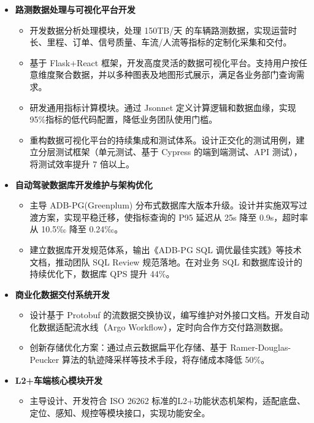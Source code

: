 \documentclass{resume}
\begin{document}
\begin{itemize}
  \item \textbf{路测数据处理与可视化平台开发}
    \begin{itemize}
        \item 开发数据分析处理模块，处理 150TB/天 的车辆路测数据，实现运营时长、里程、订单、信号质量、车流/人流等指标的定制化采集和交付。
        \item 基于 Flask+React 框架，开发高度灵活的数据可视化平台。支持用户按任意维度聚合数据，并以多种图表及地图形式展示，满足各业务部门查询需求。
        \item 研发通用指标计算模块。通过 Jsonnet 定义计算逻辑和数据血缘，实现 95\%指标的低代码配置，降低业务团队使用门槛。
        \item 重构数据可视化平台的持续集成和测试体系。设计正交化的测试用例，建立分层测试框架（单元测试、基于 Cypress 的端到端测试、API 测试），将测试效率提升 7 倍以上。
    \end{itemize}
  \item \textbf{自动驾驶数据库开发维护与架构优化}
    \begin{itemize}
        \item 主导 ADB-PG(Greenplum) 分布式数据库大版本升级。设计并实施双写过渡方案，实现平稳迁移，使指标查询的 P95 延迟从 25s 降至 0.9s，超时率从 10.5‰ 降至 0.24‰。
        \item 建立数据库开发规范体系，输出《ADB-PG SQL 调优最佳实践》等技术文档，推动团队 SQL Review 规范落地。在对业务 SQL 和数据库设计的持续优化下，数据库 QPS 提升 44\%。
    \end{itemize}
  \item \textbf{商业化数据交付系统开发}
    \begin{itemize}
        \item 设计基于 Protobuf 的流数据交换协议，编写维护对外接口文档。开发自动化数据适配流水线（Argo Workflow），定时向合作方交付路测数据。
        \item 创新存储优化方案：通过点云数据扁平化存储、基于 Ramer-Douglas-Peucker 算法的轨迹降采样等技术手段，将存储成本降低 50\%。
    \end{itemize}
  \item \textbf{L2+车端核心模块开发}
    \begin{itemize}
        \item 主导设计、开发符合 ISO 26262 标准的L2+功能状态机架构，适配底盘、定位、感知、规控等模块接口，实现功能安全。
    \end{itemize}
\end{itemize}
\end{document}
